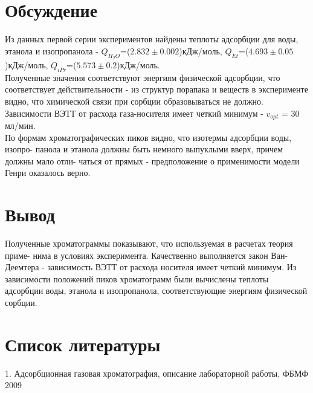 \documentclass[12pt]{article}
\begin{document}
\begin{flushleft}
\section{Обсуждение}
Из данных первой серии экспериментов найдены теплоты адсорбции для воды, этанола 
и изопропанола - $Q_{H_2O}$=($2.832 \pm 0.002$)кДж/моль,
$Q_{Et}$=($4.693 \pm 0.05$)кДж/моль,
$Q_{iPr}$=($5.573 \pm 0.2$)кДж/моль.\\ 
Полученные значения соответствуют энергиям физической адсорбции, что соответствует 
действительности - из структур порапака и веществ в эксперименте видно, что химической 
связи при сорбции образовываться не должно. 
Зависимости ВЭТТ от расхода газа-носителя имеет четкий минимум - $v_{opt}$ = 30 мл/мин.\\ 
По формам хроматографических пиков видно, что изотермы адсорбции воды, изопро- 
панола и этанола должны быть немного выпуклыми вверх, причем должны мало отли- 
чаться от прямых - предположение о применимости модели Генри оказалось верно. 
\section{Вывод}
Полученные хроматограммы показывают, что используемая в расчетах теория приме- 
нима в условиях эксперимента. Качественно выполняется закон Ван-Деемтера - зависимость ВЭТТ от расхода носителя имеет четкий минимум. 
Из зависимости положений пиков хроматограмм были вычислены теплоты адсорбции 
воды, этанола и изопропанола, соответствующие энергиям физической сорбции.
\section{Список литературы}
1. Адсорбционная
газовая
хроматография, описание лабораторной работы, ФБМФ 2009


\end{flushleft}
\end{document}

